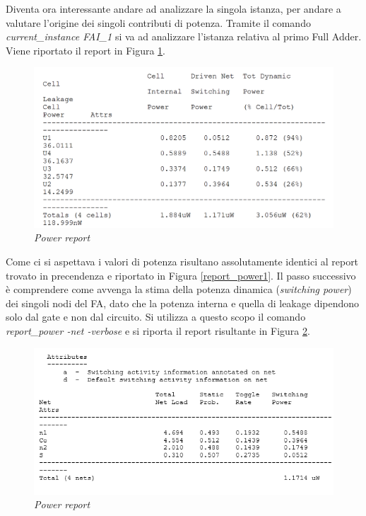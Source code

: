 Diventa ora interessante andare ad analizzare la singola istanza, per andare a valutare l'origine dei singoli contributi di potenza. Tramite il comando \textit{current\_instance FAI\_1} si va ad analizzare l'istanza relativa al primo Full Adder. Viene riportato il report in Figura \ref{reportFA1}.\\
\begin{figure}[!htb]
	\centering
	\includegraphics[scale=0.6]{immagini/reportFA1}
	\caption{\textit{Power report}}
	\label{reportFA1}
\end{figure}
Come ci si aspettava i valori di potenza risultano assolutamente identici al report trovato in precendenza e riportato in Figura \ref{report_power1}.
Il passo successivo è comprendere come avvenga la stima della potenza dinamica (\textit{switching power}) dei singoli nodi del FA, dato che la potenza interna e quella di leakage dipendono solo dal gate e non dal circuito. Si utilizza a questo scopo il comando \textit{report\_power -net -verbose} e si riporta il report risultante in Figura \ref{verbose1}.
\begin{figure}[!htb]
	\centering
	\includegraphics[scale=0.6]{immagini/verbose1}
	\caption{\textit{Power report}}
	\label{verbose1}
\end{figure}
